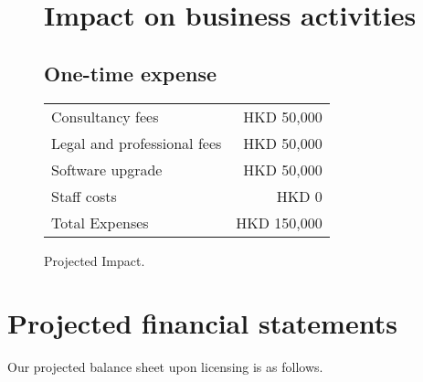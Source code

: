 \begin{figure}[h]
  \centering
  \caption{Projected Impact.}
  \label{fig:financial_statement}
  
  \section*{Impact on business activities}
  
  \subsection*{One-time expense}
  \begin{tabular}{lr}
    Consultancy fees & HKD 50,000 \\
    Legal and professional fees & HKD 50,000 \\
    Software upgrade & HKD 50,000 \\
    Staff costs & HKD 0 \\
    \midrule
    Total Expenses & HKD 150,000 \\
  \end{tabular}
\end{figure}


\section{Projected financial statements}

Our projected balance sheet upon licensing is as follows.

